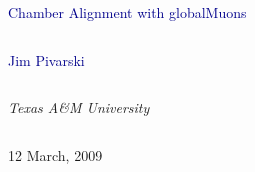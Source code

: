 \documentclass[compress]{beamer}
\begin{document}
\begin{frame}
\vfill
\begin{center}
\textcolor{darkblue}{\Large Chamber Alignment with globalMuons}

\vfill
\begin{columns}
\begin{center}
\large
\textcolor{darkblue}{Jim Pivarski}
\end{center}
\end{columns}

\begin{columns}
\begin{center}
\scriptsize
{\it Texas A\&M University}
\end{center}
\end{columns}

\vfill
12 March, 2009

\end{center}
\end{frame}


\small
\end{document}
